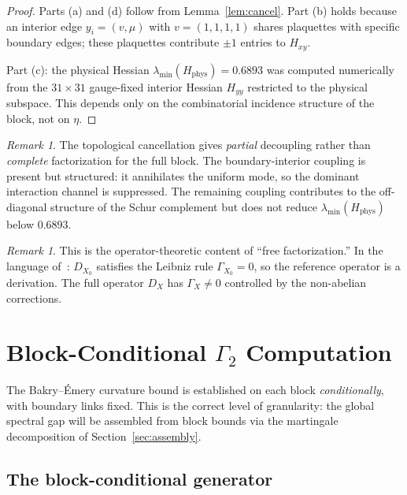 \documentclass[11pt,a4paper]{article}
\theoremstyle{plain}
\theoremstyle{definition}
\theoremstyle{remark}
\newtheorem{remark}[theorem]{Remark}
\begin{document}
\begin{proof}
Parts (a) and (d) follow from Lemma~\ref{lem:cancel}. Part (b) holds
because an interior edge $y_i = (v, \mu)$ with $v = (1,1,1,1)$ shares
plaquettes with specific boundary edges; these plaquettes contribute
$\pm 1$ entries to $H_{xy}$.

Part (c): the physical Hessian
$\lambda_{\min}(H_{\mathrm{phys}}) = 0.6893$ was computed
numerically from the $31 \times 31$ gauge-fixed interior Hessian
$H_{yy}$ restricted to the physical subspace. This depends only on
the combinatorial incidence structure of the block, not on $\eta$.
\end{proof}

\begin{remark}
The topological cancellation gives \emph{partial} decoupling rather
than \emph{complete} factorization for the full block. The
boundary-interior coupling is present but structured: it annihilates
the uniform mode, so the dominant interaction channel is suppressed.
The remaining coupling contributes to the off-diagonal structure of
the Schur complement but does not reduce
$\lambda_{\min}(H_{\mathrm{phys}})$ below $0.6893$.
\end{remark}

\begin{remark}
This is the operator-theoretic content of ``free factorization.'' In
the language of~\cite{Fontes2026a}: $D_{X_0}$ satisfies the Leibniz
rule $\Gamma_{X_0} = 0$, so the reference operator is a derivation.
The full operator $D_X$ has $\Gamma_X \neq 0$ controlled by the
non-abelian corrections.
\end{remark}


\section{Block-Conditional $\Gamma_2$ Computation}\label{sec:curvature}

The Bakry--\'Emery curvature bound is established on each block
\emph{conditionally}, with boundary links fixed. This is the correct
level of granularity: the global spectral gap will be assembled from
block bounds via the martingale decomposition of Section~\ref{sec:assembly}.

\subsection{The block-conditional generator}
\end{document}
